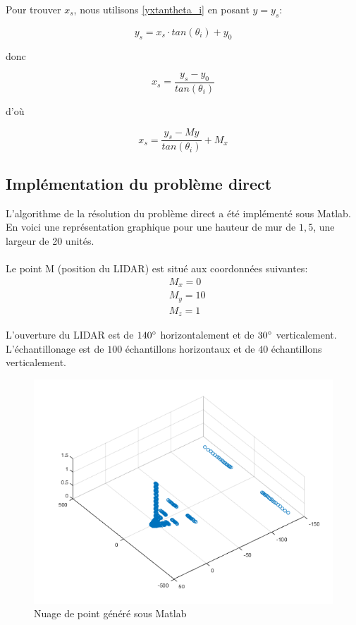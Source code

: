 \documentclass[12pt,a4paper]{report}
\begin{document}
Pour trouver $x_s$, nous utilisons \eqref{yxtantheta_i} en posant $y = y_s$:

\begin{equation}
	y_s = x_s \cdot tan(\theta_i) + y_0
\end{equation}

donc 

\begin{equation}
	x_s = \frac{y_s - y_0}{tan(\theta_i)}
\end{equation}

d'où

\begin{equation}
	\boxed{
		x_s = \frac{y_s - My}{tan(\theta_i)} + M_x
	}
\end{equation}

\newpage

\subsection{Implémentation du problème direct}
L'algorithme de la résolution du problème direct a été implémenté sous Matlab. En voici une représentation graphique pour une hauteur de mur de $1,5$, une largeur de 20 unités.


\paragraph{} Le point M (position du LIDAR) est situé aux coordonnées suivantes:
\begin{align}
	&M_x = 0 \\
	&M_y = 10 \\
	&M_z = 1 
\end{align}

L'ouverture du LIDAR est de $140 \degree$ horizontalement et de $30\degree$ verticalement. L'échantillonage est de $100$ échantillons horizontaux et de $40$ échantillons verticalement.

\begin{figure}[H]
	\centering
	\includegraphics[width=0.8\linewidth]{img/genlidardata}
	\caption{Nuage de point généré sous Matlab}
	\label{fig:genlidardata}
\end{figure}
\end{document}
